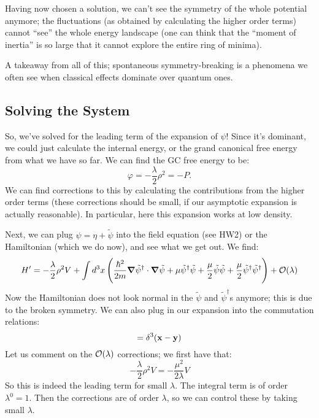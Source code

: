 Having now chosen a solution, we can't see the symmetry of the whole potential anymore; the fluctuations (as obtained by calculating the higher order terms) cannot ``see'' the whole energy landscape (one can think that the ``moment of inertia'' is so large that it cannot explore the entire ring of minima).

A takeaway from all of this; spontaneous symmetry-breaking is a phenomena we often see when classical effects dominate over quantum ones.

\subsection{Solving the System}
So, we've solved for the leading term of the expansion of $\psi$! Since it's dominant, we could just calculate the internal energy, or the grand canonical free energy from what we have so far. We can find the GC free energy to be:
\begin{equation}
    \varphi = -\frac{\lambda}{2}\rho^2 = -P.
\end{equation}
We can find corrections to this by calculating the contributions from the higher order terms (these corrections should be small, if our asymptotic expansion is actually reasonable). In particular, here this expansion works at low density.

Next, we can plug $\psi = \eta + \tilde{\psi}$ into the field equation (see HW2) or the Hamiltonian (which we do now), and see what we get out. We find:
\begin{equation}
    H' = -\frac{\lambda}{2}\rho^2 V + \int d^3x \left(\frac{\hbar^2}{2m}\nabla \tilde{\psi}^\dag \cdot \nabla \tilde{\psi} + \mu \tilde{\psi}^\dag \tilde{\psi} + \frac{\mu}{2} \tilde{\psi} \tilde{\psi} + \frac{\mu}{2}\tilde{\psi}^\dag \tilde{\psi}^\dag\right) + \O(\lambda)
\end{equation}
Now the Hamiltonian does not look normal in the $\tilde{\psi}$ and $\tilde{\psi}^\dag$s anymore; this is due to the broken symmetry. We can also plug in our expansion into the commutation relations:
\begin{equation}
    [\tilde{\psi}(\v{x}, t), \tilde{\psi}^\dag(\v{y}, t)] = \delta^3(\v{x} - \v{y})
\end{equation}
Let us comment on the $\mathcal{O}(\lambda)$ corrections; we first have that:
\begin{equation}
    -\frac{\lambda}{2}\rho^2V = -\frac{\mu^2}{2\lambda}V
\end{equation}
So this is indeed the leading term for small $\lambda$. The integral term is of order $\lambda^0 = 1$. Then the corrections are of order $\lambda$, so we can control these by taking small $\lambda$.

